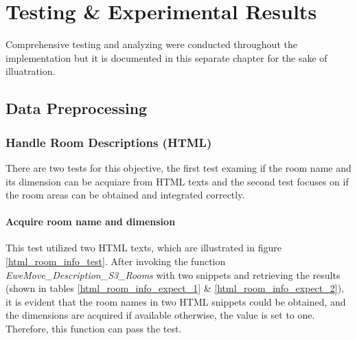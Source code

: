 \documentclass[12pt,twoside]{report}
\begin{document}
\chapter{Testing \& Experimental Results}
Comprehensive testing and analyzing were conducted throughout the implementation but it is documented in this separate chapter for the sake of illuatration. 

\section{Data Preprocessing}

\subsection{Handle Room Descriptions (HTML)}
There are two tests for this objective, the first test examing if the room name and its dimension can be acquiare from HTML texts and the second test focuses on if the room areas can be obtained and integrated correctly. 

\subsubsection{Acquire room name and dimension}
This test utilized two HTML texts, which are illustrated in figure \ref{html_room_info_test}. After invoking the function \textit{EweMove\_Description\_S3\_Rooms} with two snippets and retrieving the results (shown in tables \ref{html_room_info_expect_1} \& \ref{html_room_info_expect_2}), it is evident that the room names in two HTML snippets could be obtained, and the dimensions are acquired if available otherwise, the value is set to one. Therefore, this function can pass the test.
\end{document}
